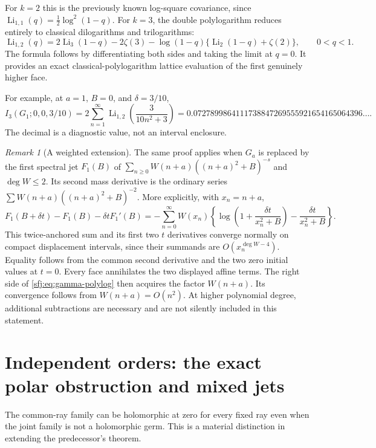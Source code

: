 \documentclass[11pt,letterpaper]{article}
\numberwithin{equation}{section}
\theoremstyle{definition}
\theoremstyle{remark}
\newtheorem{remark}[theorem]{Remark}
\DeclareMathOperator{\Li}{Li}
\begin{document}
For $k=2$ this is the previously known log-square covariance,
since $\Li_{1,1}(q)=\frac12\log^2(1-q)$.  For $k=3$, the double
polylogarithm reduces entirely to classical dilogarithms and
trilogarithms:
\begin{equation}\label{sfj:eq:Li12-classical}
 \Li_{1,2}(q)=2\Li_3(1-q)-2\zeta(3)
            -\log(1-q)\{\Li_2(1-q)+\zeta(2)\},\qquad 0<q<1.
\end{equation}
The formula follows by differentiating both sides and taking the
limit at $q=0$.  It provides an exact classical-polylogarithm lattice
evaluation of the first genuinely higher face.

For example, at $a=1$, $B=0$, and $\delta=3/10$,
\begin{equation}\label{sfj:eq:numeric-example}
 I_3(G_1;0,0,3/10)
   =2\sum_{n=1}^\infty\Li_{1,2}\!\left(\frac{3}{10n^2+3}\right)
   =0.0727899864111738847269555921654165064396\ldots.
\end{equation}
The decimal is a diagnostic value, not an interval enclosure.

\begin{remark}[A weighted extension]
The same proof applies when $G_a$ is replaced by the first spectral
jet $F_1(B)$ of $\sum_{n\ge0}W(n+a)((n+a)^2+B)^{-s}$ and
$\deg W\le2$.  Its second mass derivative is the ordinary series
$\sum W(n+a)((n+a)^2+B)^{-2}$.  More explicitly, with $x_n=n+a$,
\[
 F_1(B+\delta t)-F_1(B)-\delta tF_1'(B)
 =-\sum_{n=0}^{\infty}W(x_n)
   \left\{\log\left(1+\frac{\delta t}{x_n^2+B}\right)
                       -\frac{\delta t}{x_n^2+B}\right\}.
\]
This twice-anchored sum and its first two $t$ derivatives converge
normally on compact displacement intervals, since their summands are
$O(x_n^{\deg W-4})$.  Equality follows from the common second
derivative and the two zero initial values at $t=0$.  Every face
annihilates the two displayed affine terms.  The right side of
\eqref{sfj:eq:gamma-polylog}
then acquires the factor $W(n+a)$.  Its convergence follows from
$W(n+a)=O(n^2)$.  At higher polynomial degree, additional subtractions
are necessary and are not silently included in this statement.
\end{remark}

\section{Independent orders: the exact polar obstruction and mixed jets}
\label{sfj:sec:independent}

The common-ray family can be holomorphic at zero for every fixed ray
even when the joint family is not a holomorphic germ.  This is a
material distinction in extending the predecessor's theorem.
\end{document}
